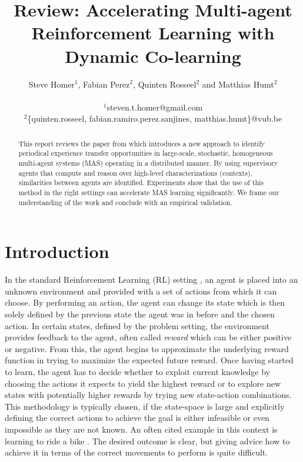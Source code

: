 \documentclass[letterpaper]{article}
\title{Review: Accelerating Multi-agent Reinforcement Learning
with Dynamic Co-learning}
\author{Steve Homer$^1$, Fabian Perez$^2$, Quinten Rosseel$^2$ and Matthias Humt$^2$ \\
\mbox{}\\
$^1$steven.t.homer@gmail.com\\
$^2$\{quinten.rosseel, fabian.ramiro.perez.sanjines, matthias.humt\}@vub.be}
\begin{document}
\maketitle

\begin{abstract} \label{sec:abstract}
 This report reviews the paper from \cite{garant2015accelerating} which introduces a new approach to identify periodical experience transfer opportunities in large-scale, stochastic, homogeneous multi-agent systems (MAS) operating in a distributed manner. By using supervisory agents that compute and reason over high-level characterizations (contexts), similarities between agents are identified. Experiments show that the use of this method in the right settings can accelerate MAS learning significantly. We frame our understanding of the work and conclude with an empirical validation.
\end{abstract}

\section{Introduction} \label{sec:introduction}
In the standard Reinforcement Learning (RL) setting \citep{sutton1998reinforcement}, an agent is placed into an unknown environment and provided with a set of actions from which it can choose. By performing an action, the agent can change its state which is then solely defined by the previous state the agent was in before and the chosen action. In certain states, defined by the problem setting, the environment provides feedback to the agent, often called \textit{reward} which can be either positive or negative. From this, the agent begins to approximate the underlying reward function in trying to maximize the expected future reward. Once having started to learn, the agent has to decide whether to exploit current knowledge by choosing the actions it expects to yield the highest reward or to explore new states with potentially higher rewards by trying new state-action combinations. This methodology is typically chosen, if the state-space is large and explicitly defining the correct actions to achieve the goal is either infeasible or even impossible as they are not known. An often cited example in this context is learning to ride a bike \citep{randlov1998learning}. The desired outcome is clear, but giving advice how to achieve it in terms of the correct movements to perform is quite difficult.
\end{document}
